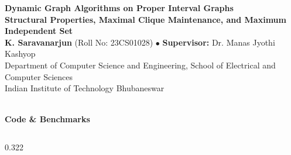 \documentclass[final,17pt]{beamer}
\begin{document}
\begin{frame}[t]

\begin{tcolorbox}[
    enhanced,
    colback=headerNavy,
    colframe=headerNavy,
    arc=0pt,
    boxrule=0pt,
    left=18pt, right=18pt, top=7pt, bottom=7pt
]
\begin{minipage}[c]{0.88\textwidth}
    {\fontsize{34}{40}\selectfont \bfseries \color{white} Dynamic Graph Algorithms on Proper Interval Graphs}\\[3pt]
    {\fontsize{21}{26}\selectfont \bfseries \color{accentBlue!35} Structural Properties, Maximal Clique Maintenance, and Maximum Independent Set}\\[5pt]
    {\fontsize{15}{20}\selectfont \color{white}
        \textbf{K. Saravanarjun} (Roll No: 23CS01028) \quad $\bullet$ \quad
        \textbf{Supervisor:} Dr. Manas Jyothi Kashyop\\[2pt]
        Department of Computer Science and Engineering, School of Electrical and Computer Sciences\\
        Indian Institute of Technology Bhubaneswar
    }
\end{minipage}
\hfill
\begin{minipage}[c]{0.10\textwidth}
    \centering
    \begin{tcolorbox}[colback=white, colframe=white, arc=3pt, boxrule=0pt, left=4pt, right=4pt, top=4pt, bottom=4pt]
        \centering
        \\[2pt]
        {\fontsize{8}{10}\selectfont \bfseries \color{headerNavy} Code \& Benchmarks}
    \end{tcolorbox}
\end{minipage}
\end{tcolorbox}

\vspace{1pt}

\begin{columns}[t]

\begin{column}{0.322\textwidth}


\end{column}
\end{columns}
\end{frame}
\end{document}
